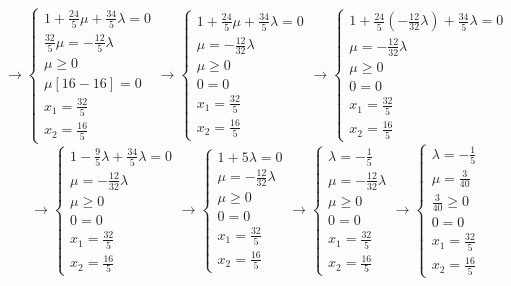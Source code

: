 \documentclass[a4paper,12pt, oneside]{book}
\begin{document}
\[\to
  \begin{cases}
    1+\frac{24}{5}\mu+\frac{34}{5}\lambda=0\\
    \frac{32}{5}\mu=-\frac{12}{5}\lambda\\
    \mu\geq 0\\
    \mu[16-16]=0\\
    x_1=\frac{32}{5} \\
    x_2=\frac{16}{5}
  \end{cases}\to
  \begin{cases}
    1+\frac{24}{5}\mu+\frac{34}{5}\lambda=0\\
    \mu=-\frac{12}{32}\lambda\\
    \mu\geq 0\\
    0=0\\
    x_1=\frac{32}{5} \\
    x_2=\frac{16}{5}
  \end{cases}\to
  \begin{cases}
    1+\frac{24}{5}\left(-\frac{12}{32}\lambda\right)+\frac{34}{5}\lambda=0\\
    \mu=-\frac{12}{32}\lambda\\
    \mu\geq 0\\
    0=0\\
    x_1=\frac{32}{5} \\
    x_2=\frac{16}{5}
  \end{cases}
\]
\[\to
  \begin{cases}
    1-\frac{9}{5}\lambda+\frac{34}{5}\lambda=0\\
    \mu=-\frac{12}{32}\lambda\\
    \mu\geq 0\\
    0=0\\
    x_1=\frac{32}{5} \\
    x_2=\frac{16}{5}
  \end{cases}\to
  \begin{cases}
    1+5\lambda=0\\
    \mu=-\frac{12}{32}\lambda\\
    \mu\geq 0\\
    0=0\\
    x_1=\frac{32}{5} \\
    x_2=\frac{16}{5}
  \end{cases}\to
  \begin{cases}
    \lambda=-\frac{1}{5}\\
    \mu=-\frac{12}{32}\lambda\\
    \mu\geq 0\\
    0=0\\
    x_1=\frac{32}{5} \\
    x_2=\frac{16}{5}
  \end{cases}\to
  \begin{cases}
    \lambda=-\frac{1}{5}\\
    \mu=\frac{3}{40}\\
    \frac{3}{40}\geq 0\\
    0=0\\
    x_1=\frac{32}{5} \\
    x_2=\frac{16}{5}
  \end{cases}
\]
\end{document}
